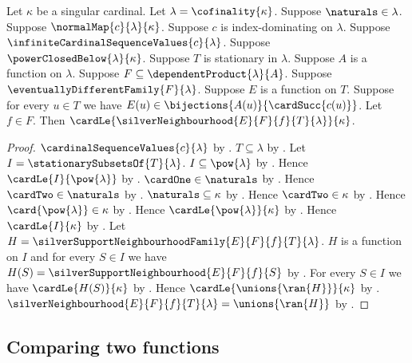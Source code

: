 \begin{theorem}\label{silver_neighbourhood_cardinal_bound}
    Let $\kappa$ be a singular cardinal.
    Let $\lambda=\cofinality{\kappa}$.
    Suppose $\naturals\in\lambda$.
    Suppose $\normalMap{c}{\lambda}{\kappa}$.
    Suppose $c$ is index-dominating on $\lambda$.
    Suppose $\infiniteCardinalSequenceValues{c}{\lambda}$.
    Suppose $\powerClosedBelow{\lambda}{\kappa}$.
    Suppose $T$ is stationary in $\lambda$.
    Suppose $A$ is a function on $\lambda$.
    Suppose $F\subseteq\dependentProduct{\lambda}{A}$.
    Suppose $\eventuallyDifferentFamily{F}{\lambda}$.
    Suppose $E$ is a function on $T$.
    Suppose for every $u\in T$ we have
        $E(u)\in\bijections{A(u)}{\cardSucc{c(u)}}$.
    Let $f\in F$.
    Then $\cardLe{\silverNeighbourhood{E}{F}{f}{T}{\lambda}}{\kappa}$.
\end{theorem}
\begin{proof}
    $\cardinalSequenceValues{c}{\lambda}$
        by .
    $T\subseteq\lambda$ by .
    Let $I=\stationarySubsetsOf{T}{\lambda}$.
    $I\subseteq\pow{\lambda}$
        by .
    Hence $\cardLe{I}{\pow{\lambda}}$ by .
    $\cardOne\in\naturals$
        by .
    Hence $\cardTwo\in\naturals$
        by .
    $\naturals\subseteq\kappa$
        by .
    Hence $\cardTwo\in\kappa$ by .
    Hence $\card{\pow{\lambda}}\in\kappa$
        by .
    Hence $\cardLe{\pow{\lambda}}{\kappa}$
        by .
    Hence $\cardLe{I}{\kappa}$ by .
    Let $H=\silverSupportNeighbourhoodFamily{E}{F}{f}{T}{\lambda}$.
    $H$ is a function on $I$ and for every $S\in I$ we have
        $H(S)=\silverSupportNeighbourhood{E}{F}{f}{S}$
        by .
    For every $S\in I$ we have $\cardLe{H(S)}{\kappa}$
        by .
    Hence $\cardLe{\unions{\ran{H}}}{\kappa}$
        by .
    $\silverNeighbourhood{E}{F}{f}{T}{\lambda}=\unions{\ran{H}}$
        by .
\end{proof}

\subsection{Comparing two functions}

